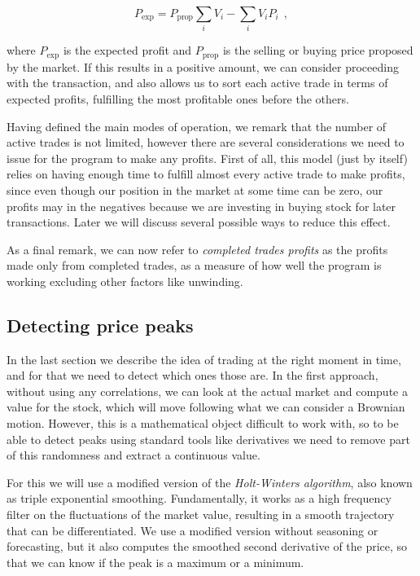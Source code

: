 \documentclass[8 pt]{article}
\begin{document}
\begin{multicols*}{2}
\begin{itemize}
    \begin{equation*}
      P_{\text{exp}} = P_{\text{prop}} \sum_i V_i - \sum_i V_i P_i ~~,
    \end{equation*}

    where $P_{\text{exp}}$ is the expected profit and $P_{\text{prop}}$ is the selling or buying price proposed by the market. If this results in a positive amount, we can consider proceeding with the transaction, and also allows us to sort each active trade in terms of expected profits, fulfilling the most profitable ones before the others.
  \end{itemize}

  Having defined the main modes of operation, we remark that the number of active trades is not limited, however there are several considerations we need to issue for the program to make any profits. First of all, this model (just by itself) relies on having enough time to fulfill almost every active trade to make profits, since even though our position in the market at some time can be zero, our profits may in the negatives because we are investing in buying stock for later transactions. Later we will discuss several possible ways to reduce this effect.

  As a final remark, we can now refer to \emph{completed trades profits} as the profits made only from completed trades, as a measure of how well the program is working excluding other factors like unwinding.

  \subsection{Detecting price peaks}

  In the last section we describe the idea of trading at the right moment in time, and for that we need to detect which ones those are. In the first approach, without using any correlations, we can look at the actual market and compute a value for the stock, which will move following what we can consider a Brownian motion. However, this is a mathematical object difficult to work with, so to be able to detect peaks using standard tools like derivatives we need to remove part of this randomness and extract a continuous value.

  For this we will use a modified version of the \emph{Holt-Winters algorithm}, also known as triple exponential smoothing. Fundamentally, it works as a high frequency filter on the fluctuations of the market value, resulting in a smooth trajectory that can be differentiated. We use a modified version without seasoning or forecasting, but it also computes the smoothed second derivative of the price, so that we can know if the peak is a maximum or a minimum.


\end{multicols*}
\end{document}
